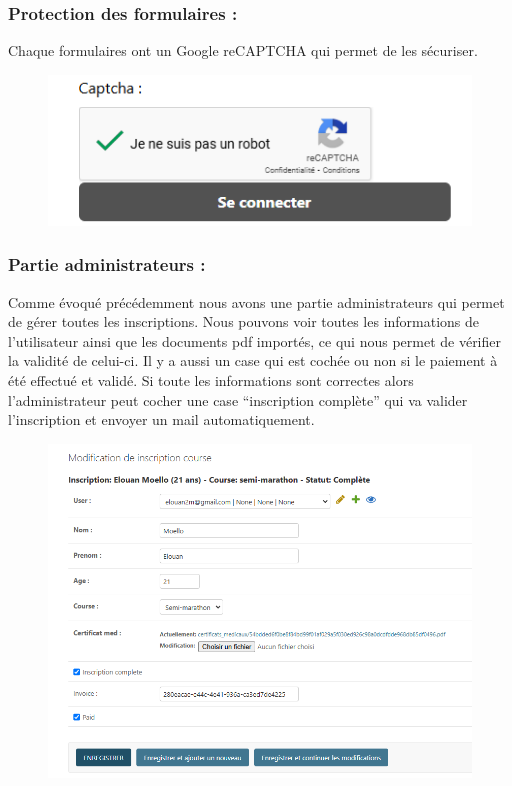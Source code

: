\documentclass[12pt]{article} %
\begin{document}
        \subsubsection{Protection des formulaires :}
            Chaque formulaires ont un Google reCAPTCHA qui permet de les sécuriser.
            \begin{figure}[hbtp]
            \centering
            \includegraphics[scale=0.8]{images/Capture_captcha.PNG}
            \end{figure}
            
        \subsubsection{Partie administrateurs :}
            Comme évoqué précédemment nous avons une partie administrateurs qui permet de gérer toutes les inscriptions. Nous pouvons voir toutes les informations de l'utilisateur ainsi que les documents pdf importés, ce qui nous permet de vérifier la validité de celui-ci. Il y a aussi un case qui est cochée ou non si le paiement à été effectué et validé. Si toute les informations sont correctes alors l'administrateur peut cocher une case “inscription complète” qui va valider l’inscription et envoyer un mail automatiquement.

            \begin{figure}[hbtp]
            \centering
            \includegraphics[scale=0.6]{images/admin_gestion.PNG}
            \end{figure}
            \newpage
\end{document}
